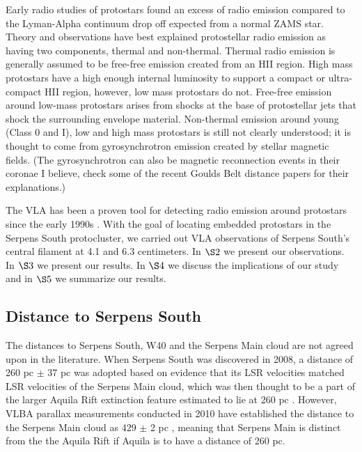 \documentclass[apj]{emulateapj}
\begin{document}
	 
	Early radio studies of protostars found an excess of radio emission compared to the Lyman-Alpha continuum drop off expected from a normal ZAMS star. Theory and observations have best explained protostellar radio emission as having two components, thermal and non-thermal. Thermal radio emission is generally assumed to be free-free emission created from an HII region. High mass protostars have a high enough internal luminosity to support a compact or ultra-compact HII region, however, low mass protostars do not. Free-free emission around low-mass protostars arises from shocks at the base of protostellar jets that shock the surrounding envelope material. Non-thermal emission around young (Class 0 and I), low and high mass protostars is still not clearly understood; it is thought to come from gyrosynchrotron emission created by stellar magnetic fields. (The gyrosynchrotron can also be magnetic reconnection events in their coronae I believe, check some of the recent Goulds Belt distance papers for their explanations.) %

	The VLA has been a proven tool for detecting radio emission around protostars since the early 1990s \citep[e.g.,][]{Curiel89, Anglada98, Reipurth99, Beltran01, Eiroa05, Shirley07, Rodriguez10,Dzib13}. With the goal of locating embedded protostars in the Serpens South protocluster, we carried out VLA observations of Serpens South's central filament at 4.1 and 6.3 centimeters. In $\S 2$ we present our observations. In $\S 3$ we present our results. In $\S 4$ we discuss the implications of our study and in $\S 5$ we summarize our results.

\subsection{Distance to Serpens South}
\label{subsec:distance to serpens south}

The distances to Serpens South, W40 and the Serpens Main cloud are not agreed upon in the literature. When Serpens South was discovered in 2008, a distance of 260 pc $\pm$ 37 pc was adopted based on evidence that its LSR velocities matched LSR velocities of the Serpens Main cloud, which was then thought to be a part of the larger Aquila Rift extinction feature estimated to lie at 260 pc \citep{Straizys03}. However, VLBA parallax measurements conducted in 2010 have established the distance to the Serpens Main cloud as 429 $\pm$ 2 pc \citep{Dzib11}, meaning that Serpens Main is distinct from the the Aquila Rift if Aquila is to have a distance of 260 pc. 
\end{document}
